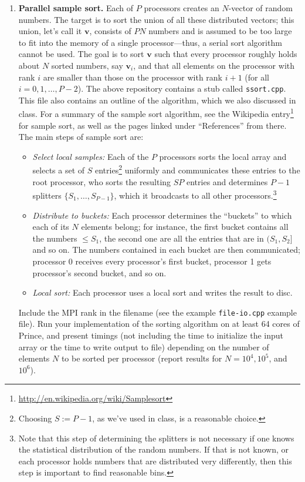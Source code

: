 \documentclass[12pt]{article}
\newcommand{\bs}{\boldsymbol}
\begin{document}
\begin{enumerate}
\item {\bf Parallel sample sort.}  Each of $P$ processors creates
  an $N$-vector of random numbers. The target is to sort the union of
  all these distributed vectors; this union, let's call it $\bs v$,
  consists of $PN$ numbers and is assumed to be too large to fit into
  the memory of a single processor---thus, a serial sort algorithm
  cannot be used.  The goal is to sort $\bs v$ such that every
  processor roughly holds about $N$ sorted numbers, say $\bs v_i$, and
  that all elements on the processor with rank $i$ are smaller
  than those on the processor with rank $i+1$ (for all $i=0,1,\ldots,
  P-2$).  The above repository contains a stub called
  \texttt{ssort.cpp}. This file also contains an outline of the
  algorithm, which we also discussed in class. For a summary of the
  sample sort algorithm, see the Wikipedia
  entry\footnote{\url{http://en.wikipedia.org/wiki/Samplesort}} for
  sample sort, as well as the pages linked under ``References'' from
  there. The main steps of sample sort are:
\begin{itemize}
\item \emph{Select local samples:} Each of the $P$ processors sorts
  the local array and selects
  a set of $S$ entries\footnote{Choosing $S:=P-1$, as we've used in
    class, is a reasonable choice.} uniformly and communicates these entries to the
  root processor, who sorts the resulting $SP$ entries and determines
  $P-1$ splitters $\{S_1,\ldots,S_{P-1}\}$, which it broadcasts to all
  other processors.\footnote{Note that this step of determining the
    splitters is not necessary if one knows the statistical distribution of the
    random numbers. If that is not known, or each processor holds
    numbers that are distributed very differently, then this step is
    important to find reasonable bins.} 
\item \emph{Distribute to buckets:} Each processor determines the
  ``buckets'' to which each of its $N$ elements belong; for instance,
  the first bucket contains all the numbers $\le S_1$, the second one
  are all the entries that are in $(S_1,S_2]$ and so on. The numbers
    contained in each bucket are then communicated; processor 0
    receives every processor's first bucket, processor 1 gets
    processor's second bucket, and so on.
\item \emph{Local sort:} Each processor uses a local sort and writes
  the result to disc.
\end{itemize}
 Include the MPI rank in the filename (see the example
 \texttt{file-io.cpp} example file).  Run your implementation of
 the sorting algorithm on at least 64 cores of Prince, and present
 timings (not including the time to initialize the input array or the
 time to write output to file) depending on the number of elements $N$
 to be sorted per processor (report results for $N=10^4, 10^5$, and $10^6$).
 

\end{enumerate}
\end{document}
